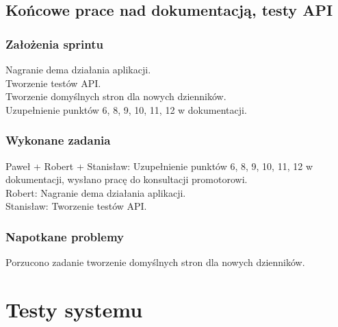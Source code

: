 \documentclass[a4paper,11pt]{report}
\begin{document}
\section {Końcowe prace nad dokumentacją, testy API}
\subsection {Założenia sprintu}
Nagranie dema działania aplikacji.\\
Tworzenie testów API.\\
Tworzenie domyślnych stron dla nowych dzienników.\\
Uzupełnienie punktów 6, 8, 9, 10, 11, 12 w dokumentacji.\\
\subsection {Wykonane zadania}
Paweł + Robert + Stanisław: Uzupełnienie punktów 6, 8, 9, 10, 11, 12 w dokumentacji, wysłano pracę do konsultacji promotorowi.\\
Robert: Nagranie dema działania aplikacji.\\
Stanisław: Tworzenie testów API.\\
\subsection {Napotkane problemy}
Porzucono zadanie tworzenie domyślnych stron dla nowych dzienników.\\

\chapter {Testy systemu}
\end{document}
